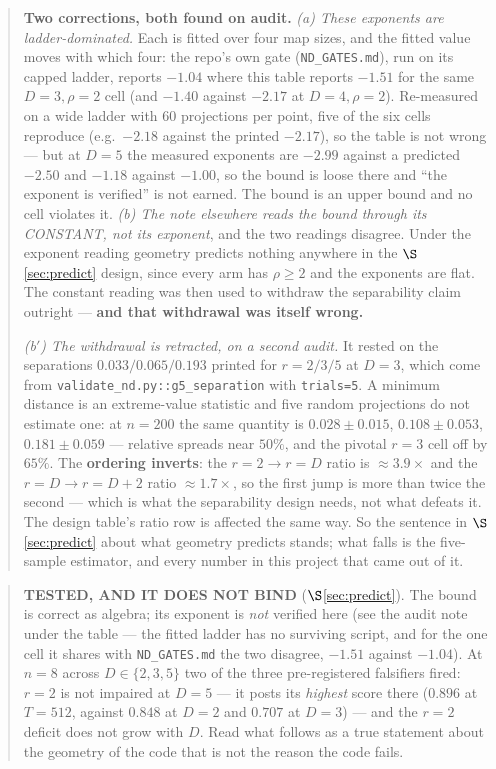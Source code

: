 \documentclass[11pt]{article}
\begin{document}
\begin{quote}\small
\textbf{Two corrections, both found on audit.} \emph{(a) These exponents are
ladder-dominated.} Each is fitted over four map sizes, and the fitted value moves
with which four: the repo's own gate (\texttt{ND\_GATES.md}), run on its capped
ladder, reports $-1.04$ where this table reports $-1.51$ for the same
$D{=}3,\rho{=}2$ cell (and $-1.40$ against $-2.17$ at $D{=}4,\rho{=}2$). Re-measured
on a wide ladder with $60$ projections per point, five of the six cells reproduce
(e.g.\ $-2.18$ against the printed $-2.17$), so the table is not wrong --- but at
$D{=}5$ the measured exponents are $-2.99$ against a predicted $-2.50$ and $-1.18$
against $-1.00$, so the bound is loose there and ``the exponent is verified'' is not
earned. The bound is an upper bound and no cell violates it.
\emph{(b) The note elsewhere reads the bound through its CONSTANT, not its
exponent}, and the two readings disagree. Under the exponent reading geometry
predicts nothing anywhere in the $\S$\ref{sec:predict} design, since every arm has
$\rho\ge2$ and the exponents are flat. The constant reading was then used to
withdraw the separability claim outright --- \textbf{and that withdrawal was itself
wrong.}

\emph{(b$'$) The withdrawal is retracted, on a second audit.} It rested on the
separations $0.033/0.065/0.193$ printed for $r=2/3/5$ at $D{=}3$, which come from
\texttt{validate\_nd.py::g5\_separation} with \texttt{trials=5}. A minimum distance
is an extreme-value statistic and five random projections do not estimate one: at
$n=200$ the same quantity is $0.028\pm0.015$, $0.108\pm0.053$, $0.181\pm0.059$ ---
relative spreads near $50\%$, and the pivotal $r=3$ cell off by $65\%$. The
\textbf{ordering inverts}: the $r{=}2\to r{=}D$ ratio is $\approx3.9\times$ and the
$r{=}D\to r{=}D{+}2$ ratio $\approx1.7\times$, so the first jump is more than twice
the second --- which is what the separability design needs, not what defeats it.
The design table's ratio row is affected the same way. So the sentence in
$\S$\ref{sec:predict} about what geometry predicts stands; what falls is the
five-sample estimator, and every number in this project that came out of it.
\end{quote}

\begin{quote}\small
\textbf{TESTED, AND IT DOES NOT BIND} ($\S$\ref{sec:predict}). The bound is
correct as algebra; its exponent is \emph{not} verified here (see the audit note
under the table --- the fitted ladder has no surviving script, and for the one
cell it shares with \texttt{ND\_GATES.md} the two disagree, $-1.51$ against
$-1.04$). At $n=8$ across $D\in\{2,3,5\}$ two of
the three pre-registered falsifiers fired: $r=2$ is not impaired at $D=5$ --- it
posts its \emph{highest} score there ($0.896$ at $T{=}512$, against $0.848$ at
$D{=}2$ and $0.707$ at $D{=}3$) --- and the $r=2$ deficit does not grow with $D$.
Read what follows as a true statement about the geometry of the code that is not
the reason the code fails.
\end{quote}
\end{document}
